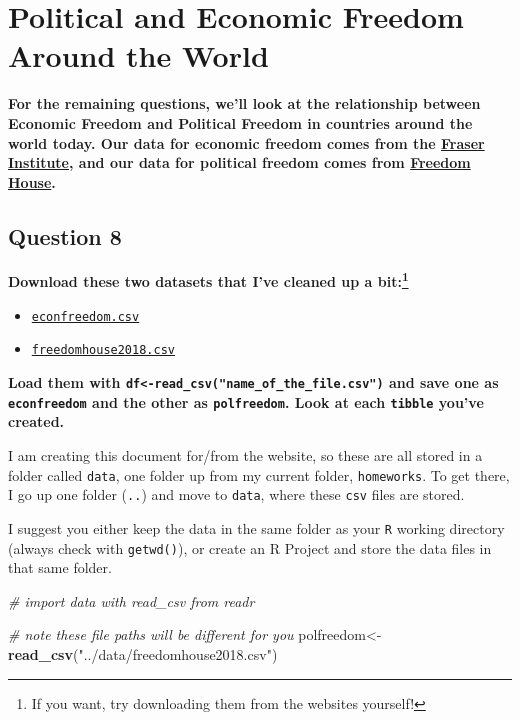 \documentclass[
]{article}
\newenvironment{Shaded}{\begin{snugshade}}{\end{snugshade}}
\newcommand{\CommentTok}[1]{\textcolor[rgb]{0.56,0.35,0.01}{\textit{#1}}}
\newcommand{\KeywordTok}[1]{\textcolor[rgb]{0.13,0.29,0.53}{\textbf{#1}}}
\newcommand{\NormalTok}[1]{#1}
\newcommand{\StringTok}[1]{\textcolor[rgb]{0.31,0.60,0.02}{#1}}
\providecommand{\tightlist}{%
  \setlength{\itemsep}{0pt}\setlength{\parskip}{0pt}}
\begin{document}
\hypertarget{political-and-economic-freedom-around-the-world}{%
\section{Political and Economic Freedom Around the
World}\label{political-and-economic-freedom-around-the-world}}

\textbf{For the remaining questions, we'll look at the relationship
between Economic Freedom and Political Freedom in countries around the
world today. Our data for economic freedom comes from the
\href{https://www.fraserinstitute.org/economic-freedom/dataset?geozone=world\&year=2016\&page=dataset}{Fraser
Institute}, and our data for political freedom comes from
\href{https://freedomhouse.org/content/freedom-world-data-and-resources}{Freedom
House}.}

\hypertarget{question-8}{%
\subsection{Question 8}\label{question-8}}

\textbf{Download these two datasets that I've cleaned up a
bit:\footnote{If you want, try downloading them from the websites
  yourself!}}

\begin{itemize}
\tightlist
\item
  \href{http://metricsf19.classes.ryansafner.com/data/econfreedom.csv}{
  \texttt{econfreedom.csv}}
\item
  \href{http://metricsf19.classes.ryansafner.com/data/freedomhouse2018.csv}{
  \texttt{freedomhouse2018.csv}}
\end{itemize}

\textbf{Load them with
\texttt{df\textless{}-read\_csv("name\_of\_the\_file.csv")} and save one
as \texttt{econfreedom} and the other as \texttt{polfreedom}. Look at
each \texttt{tibble} you've created.}

I am creating this document for/from the website, so these are all
stored in a folder called \texttt{data}, one folder up from my current
folder, \texttt{homeworks}. To get there, I go up one folder
(\texttt{..}) and move to \texttt{data}, where these \texttt{csv} files
are stored.

I suggest you either keep the data in the same folder as your \texttt{R}
working directory (always check with \texttt{getwd()}), or create an R
Project and store the data files in that same folder.

\begin{Shaded}
\begin{Highlighting}[]
\CommentTok{# import data with read_csv from readr}

\CommentTok{# note these file paths will be different for you}
\NormalTok{polfreedom<-}\KeywordTok{read_csv}\NormalTok{(}\StringTok{"../data/freedomhouse2018.csv"}\NormalTok{)}
\end{Highlighting}
\end{Shaded}
\end{document}
